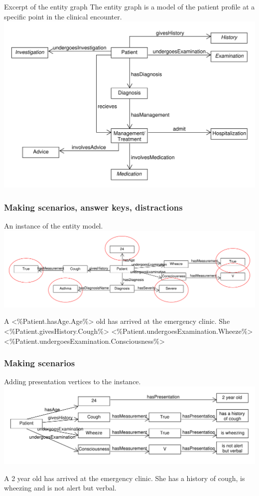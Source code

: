 \documentclass{beamer}
\begin{document}
\begin{frame}{Excerpt of the entity graph}
The entity graph is a model of the patient profile at a specific point in the clinical encounter.
\includegraphics[scale=0.45]{SimpleEntityGraph}
\end{frame}


\begin{frame}[fragile]
\frametitle{Making scenarios, answer keys, distractions}
An instance of the entity model.
\includegraphics[scale=0.35]{EntityInstanceGraph}
\begin{semiverbatim}
A <\%Patient.hasAge.Age\%> old has arrived at the 
emergency clinic.  
She <\%Patient.givesHistory.Cough\%> 
<\%Patient.undergoesExamination.Wheeze\%>
<\%Patient.undergoesExamination.Consciousness\%>
\end{semiverbatim}
\end{frame}

\begin{frame}[fragile]
\frametitle{Making scenarios}
Adding presentation vertices to the instance.
\includegraphics[scale=0.45]{PresentationEntityGraph}
\begin{semiverbatim}
	A 2 year old has arrived at the 
	emergency clinic.  
	She has a history of cough, 
	is wheezing
	and is not alert but verbal.
\end{semiverbatim}
\end{frame}
\end{document}
